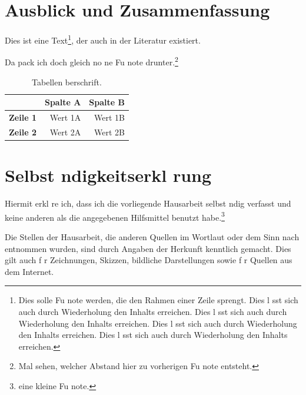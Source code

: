 \documentclass{article}
\begin{document}
\lipsum[99]

\newpage
\section{Ausblick und Zusammenfassung}
Dies ist eine Text\footnote{Dies solle Fu note werden, die den Rahmen einer Zeile sprengt. Dies l sst sich auch durch Wiederholung den Inhalts erreichen. Dies l sst sich auch durch Wiederholung den Inhalts erreichen.  Dies l sst sich auch durch Wiederholung den Inhalts erreichen. \newline Dies l sst sich auch durch Wiederholung den Inhalts erreichen.}, der auch in der Literatur existiert. 
\lipsum[32]

Da pack ich doch gleich no ne Fu note drunter.\footnote{Mal sehen, welcher Abstand hier zu vorherigen Fu note entsteht.}

\lipsum[10]

\begin{table}[!ht]					%
\centering							%
\caption[YYY]{Tabellen berschrift.}\vspace{0.8em} %
\label{tab:2}							%
\begin{tabular}{l|r|r} \toprule		%
  & \textbf{Spalte A} & \textbf{Spalte B} \\ \midrule 				%
\textbf{Zeile 1} & Wert 1A & Wert 1B \\
\textbf{Zeile 2 }& Wert 2A & Wert 2B \\ \bottomrule		%
\end{tabular}
\end{table}

\lipsum[41]


\newpage
\section{Selbst ndigkeitserkl rung}
Hiermit erkl re ich, dass ich die vorliegende Hausarbeit selbst ndig verfasst und keine anderen als die angegebenen Hilfsmittel benutzt habe.\footnote{eine kleine Fu note.}

Die Stellen der Hausarbeit, die anderen Quellen im Wortlaut oder dem Sinn nach entnommen wurden, sind durch Angaben der Herkunft kenntlich gemacht. Dies gilt auch f r Zeichnungen, Skizzen, bildliche Darstellungen sowie f r Quellen aus dem Internet.
\end{document}
